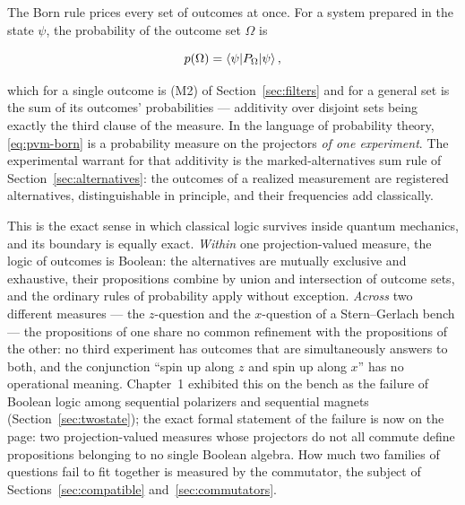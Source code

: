 The Born rule prices every set of outcomes at once. For a system prepared in the state $\psi$, the probability of the outcome set $\Omega$ is
\begin{linenomath}
    \begin{equation}
        p(\Omega) = \braket{\psi|P_\Omega|\psi},
        \label{eq:pvm-born}
    \end{equation}
\end{linenomath}
which for a single outcome is (M2) of Section~\ref{sec:filters} and for a general set is the sum of its outcomes' probabilities --- additivity over disjoint sets being exactly the third clause of the measure. In the language of probability theory, \eqref{eq:pvm-born} is a probability measure on the projectors \emph{of one experiment}. The experimental warrant for that additivity is the marked-alternatives sum rule of Section~\ref{sec:alternatives}: the outcomes of a realized measurement are registered alternatives, distinguishable in principle, and their frequencies add classically.

This is the exact sense in which classical logic survives inside quantum mechanics, and its boundary is equally exact. \emph{Within} one projection-valued measure, the logic of outcomes is Boolean: the alternatives are mutually exclusive and exhaustive, their propositions combine by union and intersection of outcome sets, and the ordinary rules of probability apply without exception. \emph{Across} two different measures --- the $z$-question and the $x$-question of a Stern--Gerlach bench --- the propositions of one share no common refinement with the propositions of the other: no third experiment has outcomes that are simultaneously answers to both, and the conjunction ``spin up along $z$ and spin up along $x$'' has no operational meaning. Chapter~1 exhibited this on the bench as the failure of Boolean logic among sequential polarizers and sequential magnets (Section~\ref{sec:twostate}); the exact formal statement of the failure is now on the page: two projection-valued measures whose projectors do not all commute define propositions belonging to no single Boolean algebra. How much two families of questions fail to fit together is measured by the commutator, the subject of Sections~\ref{sec:compatible} and~\ref{sec:commutators}.

